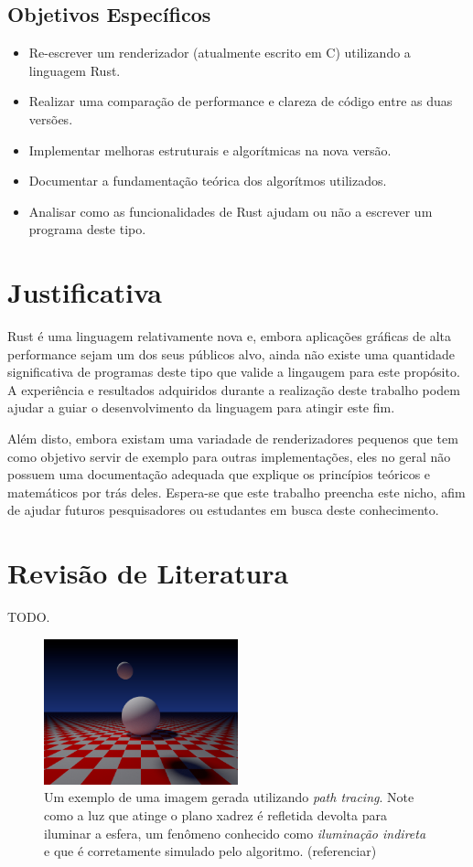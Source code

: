\documentclass[12pt]{article}
\def\Cpp{{C\nolinebreak[4]\raisebox{.20ex}{\small\bf++}}}
\newcommand{\todo}[1]{\textsf{\color{red}#1}}
\begin{document}
\subsection{Objetivos Específicos}
\begin{itemize}
	\item Re-escrever um renderizador (atualmente escrito em \Cpp) utilizando a linguagem Rust.
	\item Realizar uma comparação de performance e clareza de código entre as duas versões.
	\item Implementar melhoras estruturais e algorítmicas na nova versão.
	\item Documentar a fundamentação teórica dos algorítmos utilizados.
	\item Analisar como as funcionalidades de Rust ajudam ou não a escrever um programa deste tipo.
\end{itemize}

\section{Justificativa}

Rust é uma linguagem relativamente nova e, embora aplicações gráficas de alta performance sejam um dos seus públicos alvo, ainda não existe uma quantidade significativa de programas deste tipo que valide a lingaugem para este propósito. A experiência e resultados adquiridos durante a realização deste trabalho podem ajudar a guiar o desenvolvimento da linguagem para atingir este fim.

Além disto, embora existam uma variadade de renderizadores pequenos que tem como objetivo servir de exemplo para outras implementações, eles no geral não possuem uma documentação adequada que explique os princípios teóricos e matemáticos por trás deles. Espera-se que este trabalho preencha este nicho, afim de ajudar futuros pesquisadores ou estudantes em busca deste conhecimento.

\section{Revisão de Literatura}

\todo{TODO.}

\begin{figure}
	\centering
	\includegraphics[width=0.5\textwidth]{exemplo_imagem}
	\caption{Um exemplo de uma imagem gerada utilizando \emph{path tracing}. Note como a luz que atinge o plano xadrez é refletida devolta para iluminar a esfera, um fenômeno conhecido como \emph{iluminação indireta} e que é corretamente simulado pelo algoritmo. \todo{(referenciar)}}
\end{figure}
\end{document}
